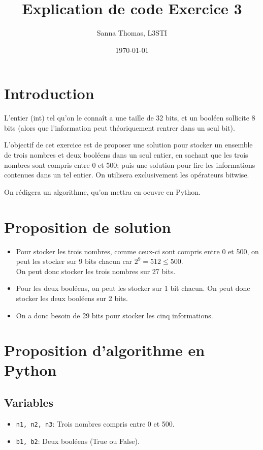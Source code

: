 \documentclass{article}
\title{Explication de code Exercice 3}
\author{Sanna Thomas, L3STI}
\date{\today}
\begin{document}
\maketitle

\section{Introduction}

L’entier (int) tel qu’on le connaît a une taille de 32 bits, et un booléen sollicite 8 bits (alors que l’information peut théoriquement rentrer dans un seul bit).

L'objectif de cet exercice est de proposer une solution pour stocker un ensemble de trois nombres et deux booléens dans un seul entier, en sachant que les trois nombres sont compris entre 0 et 500; puis une solution pour lire les informations contenues dans un tel entier. On utilisera exclusivement les opérateurs bitwise.

On rédigera un algorithme, qu'on mettra en oeuvre en Python.

\section{Proposition de solution}

\begin{itemize}
  \item Pour stocker les trois nombres, comme ceux-ci sont compris entre 0 et 500, on peut les stocker sur 9 bits chacun car $2^{9} = 512 \leq 500$. \\ On peut donc stocker les trois nombres sur 27 bits.
  \item Pour les deux booléens, on peut les stocker sur 1 bit chacun. On peut donc stocker les deux booléens sur 2 bits.
  \item On a donc besoin de 29 bits pour stocker les cinq informations.
\end{itemize}

\section{Proposition d'algorithme en Python}

\subsection*{Variables}

\begin{itemize}
  \item \texttt{n1, n2, n3}: Trois nombres compris entre 0 et 500.
  \item \texttt{b1, b2}: Deux booléens (True ou False).
\end{itemize}
\end{document}
